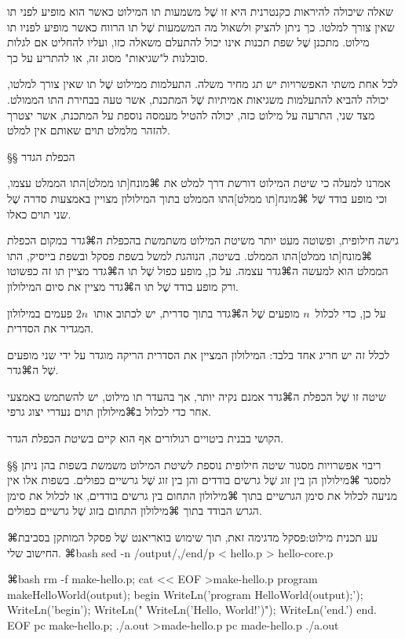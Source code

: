שאלה שיכולה להיראות כקנטרנית היא זו שֶׁל משמעות תו המילוט כאשר הוא מופיע לפני תו
שאין צורך למלטו. כך ניתן להציק ולשאול מה המשמעות שֶׁל תו הרווח כאשר מופיע לפניו
תו מילוט. מתכנן שֶׁל שפת תכנות אינו יכול להתעלם משאלה כזו, ועליו להחליט אם לגלות
סובלנות ל"שגיאות" מסוג זה, או להתריע על כך.

לכל אחת משתי האפשרויות יש תג מחיר משלה. התעלמות ממילוט שֶׁל תו שאין צורך למלטו,
יכולה להביא להתעלמות משגיאות אמיתיות שֶׁל המתכנת, אשר טעה בבחירת התו הממולט. מצד
שני, התרעה על מילוט כזה, יכולה להטיל מעמסה נוספת על המתכנת, אשר יצטרך להזהר
מלמלט תוים שאותם אין למלט.

 
§§ הכפלת הגדר

אמרנו למעלה כי שיטת המילוט דורשת דרך למלט את ⌘מונח[תו ממלט]{התו הממלט} עצמו,
וכי מופע בודד שֶׁל ⌘מונח[תו ממלט]{התו הממלט} בתוך המילולון מצויין באמצעות סדרה
שֶׁל שני תוים כאלו.

גישה חילופית, ופשוטה מעט יותר משיטת המילוט משתמשת בהכפלת ה⌘גדר במקום הכפלת
⌘מונח[תו ממלט]{התו הממלט}. בשיטה, הנוהגת למשל בשפת פסקל ובשפת בייסיק,
התו הממלט הוא למעשה ה⌘גדר עצמה. על כן, מופע כפול שֶׁל תו ה⌘גדר מציין תו זה כפשוטו ורק מופע בודד שֶׁל תו ה⌘גדר מציין את
סיום המילולון.

על כן, כדי לכלול~\(n\) מופעים שֶׁל ה⌘גדר בתוך סדרית, יש לכתוב
אותו~\(2n\) פעמים במילולון המגדיר את הסדרית.

לכלל זה יש חריג אחד בלבד:
המילולון המציין את הסדרית הריקה מוגדר על ידי שני מופעים שֶׁל ה⌘גדר.

שיטה זו שֶׁל הכפלת ה⌘גדר אמנם נקיה יותר, אך בהעדר תו מילוט, יש
להשתמש באמצעי אחר כדי לכלול ב⌘מילולון תוים נעדרי יצוג גרפי.

הקושי בבנית ביטויים רגולורים אף הוא קיים בשיטת הכפלת הגדר.

§§ ריבוי אפשרויות מסגור
שיטה חילופית נוספת לשיטת המילוט משמשת בשפות בהן ניתן למסגר ⌘מילולון הן בין זוג
שֶׁל גרשים בודדים והן בין זוג שֶׁל גרשיים כפולים. בשפות אלו אין מניעה לכלול את
סימן הגרשיים בתוך ⌘מילולון התחום בין גרשים בודדים, או לכלול את סימן הגרש הבודד
בתוך ⌘מילולון התחום בזוג שֶׁל גרשיים כפולים.

⌘עע תכנית מילוט:פסקל מדגימה זאת, תוך שימוש בואריאנט שֶׁל פסקל המותקן בסביבת
החישוב שלי.
⌘bash
sed -n /output/,/end/p < hello.p > hello-core.p
\END

⌘bash
rm -f make-hello.p; cat << EOF >make-hello.p
program makeHelloWorld(output);
begin
  WriteLn('program HelloWorld(output);');
  WriteLn('begin');
  WriteLn(" WriteLn('Hello, World!')");
  WriteLn('end.')
end.
EOF
pc make-hello.p; ./a.out >made-hello.p
pc made-hello.p
./a.out
\END

